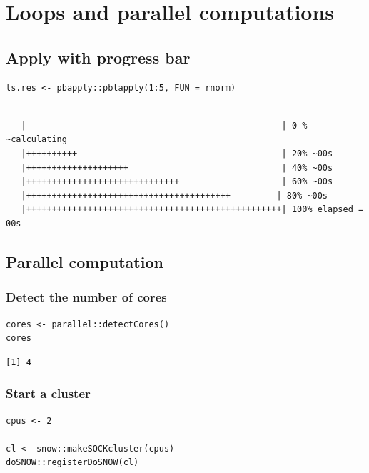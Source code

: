 \documentclass{article}
\begin{document}
\section{Loops and parallel computations}
\label{sec:org97607d8}
\subsection{Apply with progress bar}
\label{sec:org7c0cad8}

\lstset{language=r,label= ,caption= ,captionpos=b,numbers=none}
\begin{lstlisting}
ls.res <- pbapply::pblapply(1:5, FUN = rnorm)
\end{lstlisting}

\begin{verbatim}

   |                                                  | 0 % ~calculating  
   |++++++++++                                        | 20% ~00s          
   |++++++++++++++++++++                              | 40% ~00s          
   |++++++++++++++++++++++++++++++                    | 60% ~00s          
   |++++++++++++++++++++++++++++++++++++++++         | 80% ~00s          
   |++++++++++++++++++++++++++++++++++++++++++++++++++| 100% elapsed = 00s
\end{verbatim}

\subsection{Parallel computation}
\label{sec:orgf852521}
\subsubsection{Detect the number of cores}
\label{sec:org17158bc}

\lstset{language=r,label= ,caption= ,captionpos=b,numbers=none}
\begin{lstlisting}
cores <- parallel::detectCores()
cores
\end{lstlisting}

\begin{verbatim}
[1] 4
\end{verbatim}

\subsubsection{Start a cluster}
\label{sec:org79ee0af}
\lstset{language=r,label= ,caption= ,captionpos=b,numbers=none}
\begin{lstlisting}
cpus <- 2

cl <- snow::makeSOCKcluster(cpus)
doSNOW::registerDoSNOW(cl)
\end{lstlisting}
\end{document}

